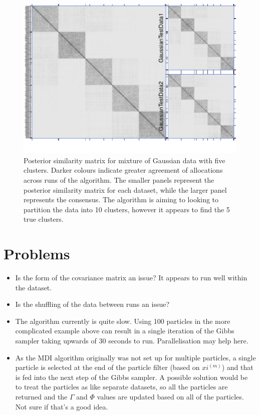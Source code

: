 \documentclass[10pt,a4paper]{article}
\begin{document}
\begin{figure}[H]
\label{fig:gaussiancluster}
\includegraphics[width = \linewidth]{plots/gaussianclust.pdf}
\caption{Posterior similarity matrix for mixture of Gaussian data with five clusters. Darker colours indicate greater agreement of allocations across runs of the algorithm. The smaller panels represent the posterior similarity matrix for each dataset, while the larger panel represents the consensus. The algorithm is aiming to looking to partition the data into 10 clusters, however it appears to find the 5 true clusters.}
\end{figure}

\section*{Problems}
\begin{itemize}
\item Is the form of the covariance matrix an issue? It appears to run well within the dataset.
\item Is the shuffling of the data between runs an issue?
\item The algorithm currently is quite slow. Using 100 particles in the more complicated example above can result in a single iteration of the Gibbs sampler taking upwards of 30 seconds to run. Parallelisation may help here.
\item As the MDI algorithm originally was not set up for multiple particles, a single particle is selected at the end of the particle filter (based on $xi^(m)$) and that is fed into the next step of the Gibbs sampler. A possible solution would be to treat the particles as like separate datasets, so all the particles are returned and the $\Gamma$ and $\Phi$ values are updated based on all of the particles. Not sure if that's a good idea.
\end{itemize}





\end{document}
